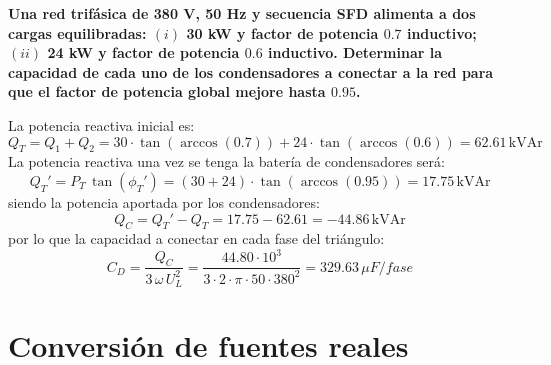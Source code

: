 		\begin{example}\label{ex.compensacion_Q_trif}
                  \textbf{Una red trifásica de 380 V, 50 Hz y
                    secuencia SFD alimenta a dos cargas equilibradas:
                    $(i)$ 30 kW y factor de potencia $0.7$ inductivo;
                    $(ii)$ 24 kW y factor de potencia $0.6$
                    inductivo. Determinar la capacidad de cada uno de
                    los condensadores a conectar a la red para que el
                    factor de potencia global mejore hasta $0.95$.}
		    
                  La potencia reactiva inicial es:
                  \begin{equation*}
                    Q_T=Q_1+Q_2=30\cdot \tan(\arccos(0.7))+24\cdot \tan(\arccos(0.6))=62.61\,\text{kVAr}
                  \end{equation*}
                  La potencia reactiva una vez se tenga la batería de
                  condensadores será:
                  \begin{equation*}
                    Q_T'=P_T\,\tan(\phi_T')=(30+24)\cdot \tan(\arccos(0.95))=17.75\,\text{kVAr}
                  \end{equation*}
                  siendo la potencia aportada por los condensadores:
                  \begin{equation*}
                    Q_C=Q_T'-Q_T=17.75-62.61=-44.86\,\text{kVAr}
                  \end{equation*}
                  por lo que la capacidad a conectar en cada fase del
                  triángulo:
                  \begin{equation*}
                    C_D=\dfrac{Q_C}{3\,\omega\,U_L^2}=\dfrac{44.80\cdot 10^3}{3\cdot 2\cdot \pi\cdot 50\cdot 380^2}=329.63\,\mu F/fase
                  \end{equation*}
		\end{example}

		 
\section{Conversión de fuentes reales}
\label{sec:conversion-fuentes-reales}

	

